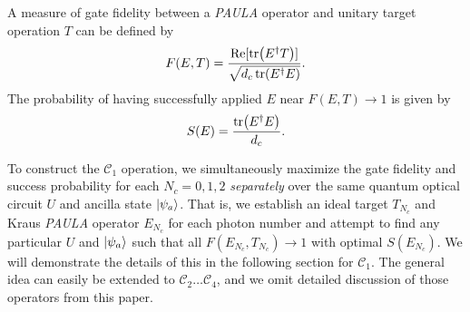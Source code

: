 \documentclass[aps,pra,twocolumn,showpacs,superscriptaddress,floatfix,10pt]{revtex4}
\begin{document}
A measure of gate fidelity between a \textit{PAULA} operator and unitary target operation $T$ can be defined by
\begin{equation}
\label{Gate Fidelity}
F(E,T) = \frac{\Re[\tr(E^\dagger T)]}{\sqrt{d_c \tr(E^\dagger E)} }.
\end{equation}
The probability of having successfully applied $E$ near $F(E,T) \rightarrow 1$ is given by
\begin{equation}
\label{Success Probability} 
S(E) = \frac{\tr(E^\dagger E)}{d_c}.
\end{equation}

To construct the $\mathcal{C}_1$ operation, we simultaneously maximize the gate fidelity and success probability for each  $N_c=0,1,2$ \textit{separately} over the same quantum optical circuit $U$ and ancilla state $\ket{\psi_a}$. That is, we establish an ideal target $T_{N_c}$ and Kraus \textit{PAULA} operator $E_{N_c}$ for each photon number and attempt to find any particular $U$ and $\ket{\psi_a}$ such that all $F(E_{N_c},T_{N_c}) \rightarrow 1$ with optimal $S(E_{N_c})$. We will demonstrate the details of this in the following section for $\mathcal{C}_1$. The general idea can easily be extended to $\mathcal{C}_2 \dots \mathcal{C}_4$, and we omit detailed discussion of those operators from this paper.
\end{document}
